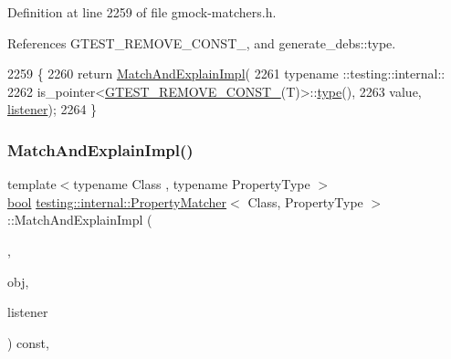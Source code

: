 Definition at line 2259 of file gmock-\/matchers.\+h.



References G\+T\+E\+S\+T\+\_\+\+R\+E\+M\+O\+V\+E\+\_\+\+C\+O\+N\+S\+T\+\_\+, and generate\+\_\+debs\+::type.


\begin{DoxyCode}
2259                                                                            \{
2260     \textcolor{keywordflow}{return} \hyperlink{classtesting_1_1internal_1_1PropertyMatcher_aee28dd64a2896159661a4f3ad3329ffd}{MatchAndExplainImpl}(
2261         typename ::testing::internal::
2262             is\_pointer<\hyperlink{gtest-internal_8h_a2ffec8c60510eb130af387f5ce9a756a}{GTEST\_REMOVE\_CONST\_}(T)>::\hyperlink{namespacegenerate__debs_a50bc9a7ecac9584553e089a448bcde58}{type}(),
2263         value, \hyperlink{namespaceinteractive__marker_a0e579ab555212bb5e2c9f8a675b7618a}{listener});
2264   \}
\end{DoxyCode}
\mbox{\label{classtesting_1_1internal_1_1PropertyMatcher_aee28dd64a2896159661a4f3ad3329ffd}} 
\subsubsection{\texorpdfstring{Match\+And\+Explain\+Impl()}{MatchAndExplainImpl()}\hspace{0.1cm}{\footnotesize\ttfamily [1/2]}}
{\footnotesize\ttfamily template$<$typename Class , typename Property\+Type $>$ \\
\hyperlink{classbool}{bool} \hyperlink{classtesting_1_1internal_1_1PropertyMatcher}{testing\+::internal\+::\+Property\+Matcher}$<$ Class, Property\+Type $>$\+::Match\+And\+Explain\+Impl (\begin{DoxyParamCaption}\item[{\hyperlink{namespacetesting_1_1internal_abb1d0789f19bdde21affccbd1078b525}{false\+\_\+type}}]{,  }\item[{const Class \&}]{obj,  }\item[{\hyperlink{classtesting_1_1MatchResultListener}{Match\+Result\+Listener} $\ast$}]{listener }\end{DoxyParamCaption}) const\hspace{0.3cm}{\ttfamily [inline]}, {\ttfamily [private]}}



